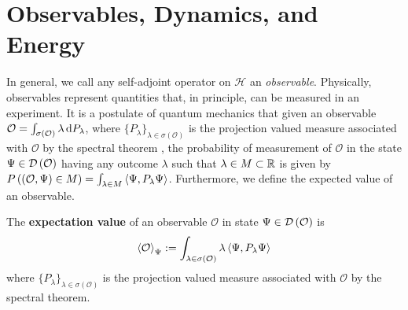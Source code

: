 \section{Observables, Dynamics, and Energy}
In general, we call any self-adjoint operator on $ \mathcal{H} $ an \emph{observable}. Physically, observables represent quantities that, in principle, can be measured in an experiment. It is a postulate of quantum mechanics that given an observable $ \mathcal{O}=\int_{\sigma(\mathcal{O})}\lambda \mathop{}\!\mathrm{d} P_\lambda $, where $\{P_\lambda\}_{\lambda\in\sigma(\mathcal{O})}$ is the projection valued measure associated with $ \mathcal{O} $ by the spectral theorem \cite{reed1981functional}, the probability of measurement of $ \mathcal{O} $ in the state $ \Psi\in\mathcal D\left(\mathcal{O}\right) $ having any outcome $ \lambda $ such that $ \lambda\in M\subset \mathbb{R} $ is given by $ P\left((\mathcal{O},\Psi)\in M\right)=\int_{\lambda\in M} \left\langle\Psi,P_\lambda\Psi\right\rangle $. 
Furthermore, we define the expected value of an observable.
\begin{definition}
	The \textbf{expectation value} of an observable $ \mathcal{O} $ in state $ \Psi\in\mathcal D\left(\mathcal{O}\right) $ is 
	$$ \left\langle\mathcal{O}\right\rangle_\Psi:=\int_{\lambda\in\sigma(\mathcal{O})}\lambda\left\langle\Psi,P_\lambda\Psi\right\rangle $$
	where $\{P_\lambda\}_{\lambda\in\sigma(\mathcal{O})}$ is the projection valued measure associated with $ \mathcal{O} $ by the spectral theorem.
\end{definition}



